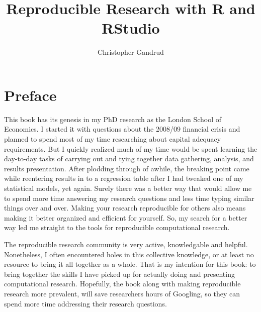 \documentclass[krantz1]{krantz}
\newcommand{\blankpage}{
	\newpage
	\thispagestyle{empty}
	\mbox{}
	\newpage
}
\begin{document}
\title{Reproducible Research with R and RStudio}

\author{Christopher Gandrud}

\maketitle


\frontmatter

\blankpage
\blankpage
\blankpage
\blankpage




\chapter*{Preface}

\noindent This book has its genesis in my PhD research as the London School of Economics. I started it with questions about the 2008/09 financial crisis and planned to spend most of my time researching about capital adequacy requirements. But I quickly realized much of my time would be spent learning the day-to-day tasks of carrying out and tying together data gathering, analysis, and results presentation. After plodding through of awhile, the breaking point came while reentering results in to a regression table after I had tweaked one of my statistical models, yet again. Surely there was a better way that would allow me to spend more time answering my research questions and less time typing similar things over and over. Making your research reproducible for others also means making it better organized and efficient for yourself. So, my search for a better way led me straight to the tools for reproducible computational research. 

The reproducible research community is very active, knowledgable and helpful. Nonetheless, I often encountered holes in this collective knowledge, or at least no resource to bring it all together as a whole. That is my intention for this book: to bring together the skills I have picked up for actually doing and presenting computational research. Hopefully, the book along with making reproducible research more prevalent, will save researchers hours of Googling, so they can spend more time addressing their research questions.  
\end{document}
